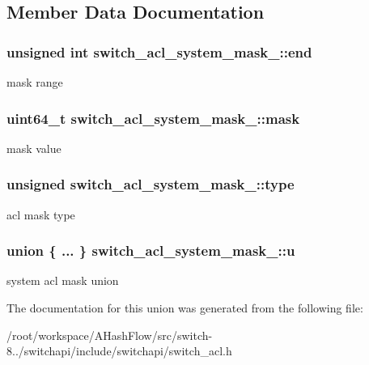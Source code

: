 \subsection{Member Data Documentation}
\hypertarget{unionswitch__acl__system__mask___ac5a432e4432f54d5b996c1c64a63be61}{
\subsubsection[{end}]{\setlength{\rightskip}{0pt plus 5cm}unsigned int switch\+\_\+acl\+\_\+system\+\_\+mask\+\_\+\+::end}}\label{unionswitch__acl__system__mask___ac5a432e4432f54d5b996c1c64a63be61}
mask range \hypertarget{unionswitch__acl__system__mask___a8c6a54e7156ab1d71239f7cd69d15edc}{
\subsubsection[{mask}]{\setlength{\rightskip}{0pt plus 5cm}uint64\+\_\+t switch\+\_\+acl\+\_\+system\+\_\+mask\+\_\+\+::mask}}\label{unionswitch__acl__system__mask___a8c6a54e7156ab1d71239f7cd69d15edc}
mask value \hypertarget{unionswitch__acl__system__mask___a6ed8653c33d95bc0e0f30a14fe7f4998}{
\subsubsection[{type}]{\setlength{\rightskip}{0pt plus 5cm}unsigned switch\+\_\+acl\+\_\+system\+\_\+mask\+\_\+\+::type}}\label{unionswitch__acl__system__mask___a6ed8653c33d95bc0e0f30a14fe7f4998}
acl mask type \hypertarget{unionswitch__acl__system__mask___a9dd06dc254bca87f582a7e0b7070dc8d}{
\subsubsection[{u}]{\setlength{\rightskip}{0pt plus 5cm}union \{ ... \}   switch\+\_\+acl\+\_\+system\+\_\+mask\+\_\+\+::u}}\label{unionswitch__acl__system__mask___a9dd06dc254bca87f582a7e0b7070dc8d}
system acl mask union 

The documentation for this union was generated from the following file\+:\begin{DoxyCompactItemize}
\item 
/root/workspace/\+A\+Hash\+Flow/src/switch-\/8../switchapi/include/switchapi/switch\+\_\+acl.\+h\end{DoxyCompactItemize}
